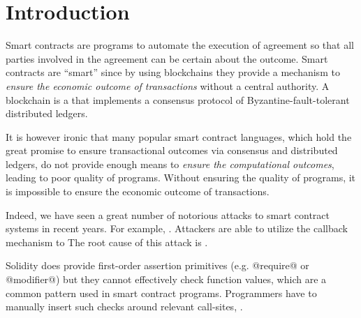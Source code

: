 \documentclass[acmsmall,review,anonymous]{acmart}\settopmatter{printfolios=true,printccs=false,printacmref=false}
\begin{document}
\section{Introduction}




Smart contracts are programs to automate the execution of agreement so that all
parties involved in the agreement can be certain about the outcome.
Smart contracts are ``smart'' since by using blockchains they provide a
mechanism to \emph{ensure the economic outcome of transactions} without a
central authority.
A blockchain is a  that implements a consensus protocol of
Byzantine-fault-tolerant distributed ledgers.

It is however ironic that many popular smart contract languages, which hold the
great promise to ensure transactional outcomes via consensus and distributed
ledgers, do not provide enough means to \emph{ensure the computational outcomes},
leading to poor quality of programs.
Without ensuring the quality of programs, it is impossible to ensure
the economic outcome of transactions.

Indeed, we have seen a great number of notorious attacks to smart contract
systems in recent years.
For example, .
Attackers are able to utilize
the callback mechanism to 
The root cause of this attack is .

Solidity does provide first-order assertion primitives (e.g. @require@ or
@modifier@) but they cannot effectively check function values, which are a
common pattern used in smart contract programs.
Programmers have to manually insert such checks around relevant call-sites, .
\end{document}
